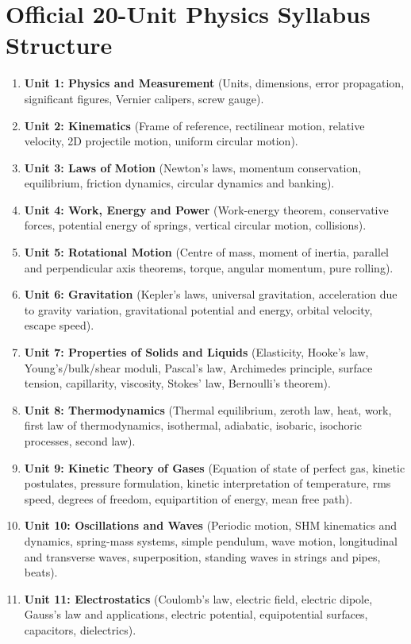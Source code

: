 \documentclass[10pt,twoside,openright]{book}
\begin{document}
\section*{Official 20-Unit Physics Syllabus Structure}

\begin{enumerate}[leftmargin=*]
  \item \textbf{Unit 1: Physics and Measurement} (Units, dimensions, error propagation, significant figures, Vernier calipers, screw gauge).
  \item \textbf{Unit 2: Kinematics} (Frame of reference, rectilinear motion, relative velocity, 2D projectile motion, uniform circular motion).
  \item \textbf{Unit 3: Laws of Motion} (Newton's laws, momentum conservation, equilibrium, friction dynamics, circular dynamics and banking).
  \item \textbf{Unit 4: Work, Energy and Power} (Work-energy theorem, conservative forces, potential energy of springs, vertical circular motion, collisions).
  \item \textbf{Unit 5: Rotational Motion} (Centre of mass, moment of inertia, parallel and perpendicular axis theorems, torque, angular momentum, pure rolling).
  \item \textbf{Unit 6: Gravitation} (Kepler's laws, universal gravitation, acceleration due to gravity variation, gravitational potential and energy, orbital velocity, escape speed).
  \item \textbf{Unit 7: Properties of Solids and Liquids} (Elasticity, Hooke's law, Young's/bulk/shear moduli, Pascal's law, Archimedes principle, surface tension, capillarity, viscosity, Stokes' law, Bernoulli's theorem).
  \item \textbf{Unit 8: Thermodynamics} (Thermal equilibrium, zeroth law, heat, work, first law of thermodynamics, isothermal, adiabatic, isobaric, isochoric processes, second law).
  \item \textbf{Unit 9: Kinetic Theory of Gases} (Equation of state of perfect gas, kinetic postulates, pressure formulation, kinetic interpretation of temperature, rms speed, degrees of freedom, equipartition of energy, mean free path).
  \item \textbf{Unit 10: Oscillations and Waves} (Periodic motion, SHM kinematics and dynamics, spring-mass systems, simple pendulum, wave motion, longitudinal and transverse waves, superposition, standing waves in strings and pipes, beats).
  \item \textbf{Unit 11: Electrostatics} (Coulomb's law, electric field, electric dipole, Gauss's law and applications, electric potential, equipotential surfaces, capacitors, dielectrics).

\end{enumerate}
\end{document}
